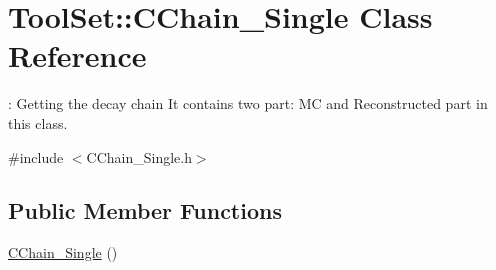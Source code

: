 \hypertarget{classToolSet_1_1CChain__Single}{
\section{ToolSet::CChain\_\-Single Class Reference}
\label{classToolSet_1_1CChain__Single}
}


: Getting the decay chain It contains two part: MC and Reconstructed part in this class.  


{\ttfamily \#include $<$CChain\_\-Single.h$>$}\subsection*{Public Member Functions}
\begin{DoxyCompactItemize}
\item 
\hypertarget{classToolSet_1_1CChain__Single_acfe5a82da8d9f4e0d5339b19b0aaca55}{
\hyperlink{classToolSet_1_1CChain__Single_acfe5a82da8d9f4e0d5339b19b0aaca55}{CChain\_\-Single} ()}
\label{classToolSet_1_1CChain__Single_acfe5a82da8d9f4e0d5339b19b0aaca55}


\end{DoxyCompactItemize}
